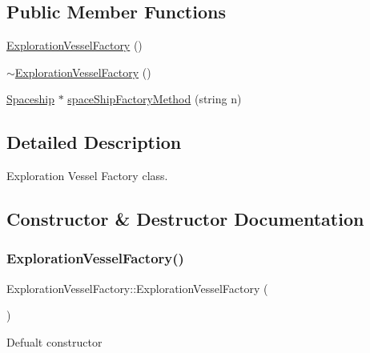 \subsection*{Public Member Functions}
\begin{DoxyCompactItemize}
\item 
\hyperlink{classExplorationVesselFactory_a4cf974e1ad11c9597a5cd7546a199ded}{Exploration\+Vessel\+Factory} ()
\item 
\hyperlink{classExplorationVesselFactory_a52d1a2adb9d442c82a253de5d68e7b08}{$\sim$\+Exploration\+Vessel\+Factory} ()
\item 
\hyperlink{classSpaceship}{Spaceship} $\ast$ \hyperlink{classExplorationVesselFactory_a67f065b62fedea7805291bd7a3d0b81d}{space\+Ship\+Factory\+Method} (string n)
\end{DoxyCompactItemize}


\subsection{Detailed Description}
Exploration Vessel Factory class. 

\subsection{Constructor \& Destructor Documentation}
\mbox{\label{classExplorationVesselFactory_a4cf974e1ad11c9597a5cd7546a199ded}} 
\subsubsection{\texorpdfstring{Exploration\+Vessel\+Factory()}{ExplorationVesselFactory()}}
{\footnotesize\ttfamily Exploration\+Vessel\+Factory\+::\+Exploration\+Vessel\+Factory (\begin{DoxyParamCaption}{ }\end{DoxyParamCaption})}

Defualt constructor \mbox{\label{classExplorationVesselFactory_a52d1a2adb9d442c82a253de5d68e7b08}} 
